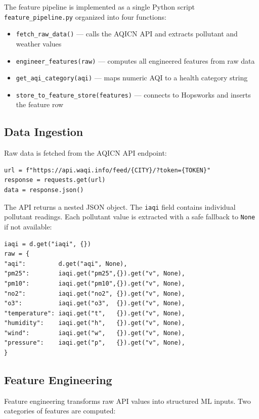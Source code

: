 \documentclass[conference]{IEEEtran}
\begin{document}
The feature pipeline is implemented as a single Python script \texttt{feature\_pipeline.py} organized into four functions:

\begin{itemize}[leftmargin=1.5em, itemsep=2pt]
    \item \texttt{fetch\_raw\_data()} — calls the AQICN API and extracts pollutant and weather values
    \item \texttt{engineer\_features(raw)} — computes all engineered features from raw data
    \item \texttt{get\_aqi\_category(aqi)} — maps numeric AQI to a health category string
    \item \texttt{store\_to\_feature\_store(features)} — connects to Hopsworks and inserts the feature row
\end{itemize}

\subsection{Data Ingestion}

Raw data is fetched from the AQICN API endpoint:

\begin{lstlisting}
url = f"https://api.waqi.info/feed/{CITY}/?token={TOKEN}"
response = requests.get(url)
data = response.json()
\end{lstlisting}

The API returns a nested JSON object. The \texttt{iaqi} field contains individual pollutant readings. Each pollutant value is extracted with a safe fallback to \texttt{None} if not available:

\begin{lstlisting}
iaqi = d.get("iaqi", {})
raw = {
"aqi":         d.get("aqi", None),
"pm25":        iaqi.get("pm25",{}).get("v", None),
"pm10":        iaqi.get("pm10",{}).get("v", None),
"no2":         iaqi.get("no2", {}).get("v", None),
"o3":          iaqi.get("o3",  {}).get("v", None),
"temperature": iaqi.get("t",   {}).get("v", None),
"humidity":    iaqi.get("h",   {}).get("v", None),
"wind":        iaqi.get("w",   {}).get("v", None),
"pressure":    iaqi.get("p",   {}).get("v", None),
}
\end{lstlisting}

\subsection{Feature Engineering}

Feature engineering transforms raw API values into structured ML inputs. Two categories of features are computed:
\end{document}
